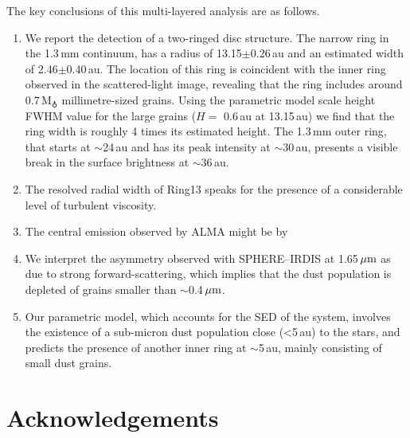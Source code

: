 \documentclass[fleqn,usenatbib,useAMS]{mnras}
\begin{document}
The key conclusions of this multi-layered analysis are as follows.
\begin{enumerate}
  \item We report the detection of a two-ringed disc structure. The narrow ring in the 1.3\,mm continuum, has a radius of 13.15$\pm$0.26\,au and an estimated width of 2.46$\pm$0.40\,au. The location of this ring is coincident with the inner ring observed in the scattered-light image, revealing that the ring includes around 0.7\,M$_{\earth}$ millimetre-sized grains. Using the parametric model scale height FWHM value for the large grains ($H=$ 0.6\,au at 13.15\,au) we find that the ring width is roughly 4 times its estimated height. The 1.3\,mm outer ring, that starts at $\sim$24\,au and has its peak intensity at $\sim$30\,au, presents a visible break in the surface brightness at $\sim$36\,au.
  
  \item The resolved radial width of Ring13 speaks for the presence of a considerable level of turbulent viscosity.
  
  \item The central emission observed by ALMA might be by 
    
  \item We interpret the asymmetry observed with SPHERE--IRDIS at 1.65\,$\hbox{$\mu$m}$ as due to strong forward-scattering, which implies that the dust population is depleted of grains smaller than $\sim$0.4\,$\hbox{$\mu$m}$.
  
  \item Our parametric model, which accounts for the SED of the system, involves the existence of a sub-micron dust population close (<5\,au) to the stars, and predicts the presence of another inner ring at $\sim$5\,au, mainly consisting of small dust grains.
    
\end{enumerate}

\section*{Acknowledgements}
\end{document}

